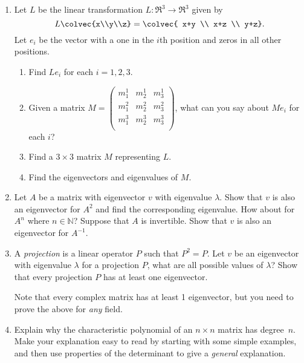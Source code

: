 \begin{enumerate}
\item Let $L$ be the linear transformation $L \colon \Re^3\rightarrow \Re^3$ given by 
$$L\colvec{x\\y\\z}=\colvec{ x+y \\  x+z \\ y+z}.$$  
Let $e_i$ be the vector with a one in the $i$th position and zeros in all other positions.
\begin{enumerate}
\item Find $Le_i$ for each $i=1,2,3$.
\item Given a matrix $M=\begin{pmatrix}
m^1_1 & m^1_2 & m^1_3\\
m^2_1 & m^2_2 & m^2_3\\
m^3_1 & m^3_2 & m^3_3\\
\end{pmatrix}$, what can you say about $Me_i$ for each $i$?
\item Find a $3\times 3$ matrix $M$ representing $L$.  
\item Find the eigenvectors and eigenvalues of \(M.\)

\end{enumerate}


\item Let $A$ be a matrix with eigenvector $v$ with eigenvalue $\lambda$. Show that $v$ is also an eigenvector for $A^2$ and find the corresponding eigenvalue. How about for $A^n$ where $n \in \mathbb{N}$? Suppose that $A$ is invertible. Show that $v$ is also an eigenvector for $A^{-1}$.

\item A \emph{projection} is a linear operator $P$ such that $P^2 = P$. Let $v$ be an eigenvector with eigenvalue $\lambda$ for a projection $P$, what are all possible values of $\lambda$? Show that every projection $P$ has at least one eigenvector.

Note that every complex matrix has at least 1 eigenvector, but you need to prove the above for \emph{any} field.


\item Explain why the characteristic polynomial of an $n\times n$ matrix has degree~$n$.  Make your explanation easy to read by starting with some simple examples, and then use properties of the determinant to give a \emph{general} explanation.


\end{enumerate}
